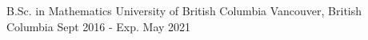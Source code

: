 

\begin{cventries}

  \cventry
    {B.Sc. in Mathematics} %
    {University of British Columbia} %
    {Vancouver, British Columbia} %
    {Sept 2016 - Exp. May 2021} %
    {}

\end{cventries}
